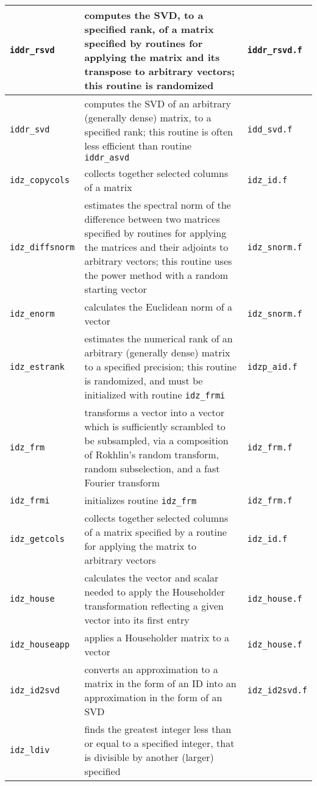 \documentclass[letterpaper,12pt]{article}
\begin{document}
\begin{center}
\begin{supertabular}{>{\raggedright}p{1.2in} p{.53\textwidth} l}
%
{\tt iddr\_rsvd} & computes the SVD, to a specified rank, of a matrix
specified by routines for applying the matrix and its transpose to
arbitrary vectors; this routine is randomized & {\tt iddr\_rsvd.f}
\\\hline
%
{\tt iddr\_svd} & computes the SVD of an arbitrary (generally dense)
matrix, to a specified rank; this routine is often less efficient than
routine {\tt iddr\_asvd} & {\tt idd\_svd.f} \\\hline
%
{\tt idz\_copycols} & collects together selected columns of a matrix &
{\tt idz\_id.f} \\\hline
%
{\tt idz\_diffsnorm} & estimates the spectral norm of the difference
between two matrices specified by routines for applying the matrices
and their adjoints to arbitrary vectors; this routine uses the power
method with a random starting vector & {\tt idz\_snorm.f} \\\hline
%
{\tt idz\_enorm} & calculates the Euclidean norm of a vector &
{\tt idz\_snorm.f} \\\hline
%
{\tt idz\_estrank} & estimates the numerical rank of an arbitrary
(generally dense) matrix to a specified precision; this routine is
randomized, and must be initialized with routine {\tt idz\_frmi} &
{\tt idzp\_aid.f} \\\hline
%
{\tt idz\_frm} & transforms a vector into a vector which is
sufficiently scrambled to be subsampled, via a composition of Rokhlin's
random transform, random subselection, and a fast Fourier transform &
{\tt idz\_frm.f} \\\hline
%
{\tt idz\_frmi} & initializes routine {\tt idz\_frm} & {\tt idz\_frm.f}
\\\hline
%
{\tt idz\_getcols} & collects together selected columns of a matrix
specified by a routine for applying the matrix to arbitrary vectors &
{\tt idz\_id.f} \\\hline
%
{\tt idz\_house} & calculates the vector and scalar needed to apply the
Householder transformation reflecting a given vector into its first
entry & {\tt idz\_house.f} \\\hline
%
{\tt idz\_houseapp} & applies a Householder matrix to a vector &
{\tt idz\_house.f} \\\hline
%
{\tt idz\_id2svd} & converts an approximation to a matrix in the form
of an ID into an approximation in the form of an SVD &
{\tt idz\_id2svd.f} \\\hline
%
{\tt idz\_ldiv} & finds the greatest integer less than or equal to a
specified integer, that is divisible by another (larger) specified

\end{supertabular}
\end{center}
\end{document}

